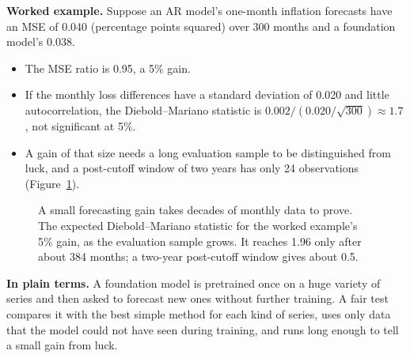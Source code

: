 \textbf{Worked example.} Suppose an AR model's one-month inflation forecasts have an MSE of 0.040 (percentage points squared) over 300 months and a foundation model's 0.038.

\begin{itemize}
  \item The MSE ratio is 0.95, a 5\% gain.
  \item If the monthly loss differences have a standard deviation of 0.020 and little autocorrelation, the Diebold--Mariano statistic is $0.002 / (0.020/\sqrt{300}) \approx 1.7$, not significant at 5\%.
  \item A gain of that size needs a long evaluation sample to be distinguished from luck, and a post-cutoff window of two years has only 24 observations (Figure~\ref{fig:21-dm}).
\end{itemize}

\begin{figure}[htbp]
\centering
{}
\caption{A small forecasting gain takes decades of monthly data to prove. The expected Diebold--Mariano statistic for the worked example's 5\% gain, as the evaluation sample grows. It reaches 1.96 only after about 384 months; a two-year post-cutoff window gives about 0.5.}
\label{fig:21-dm}
\end{figure}

\noindent\textbf{In plain terms.} A foundation model is pretrained once on a huge variety of series and then asked to forecast new ones without further training. A fair test compares it with the best simple method for each kind of series, uses only data that the model could not have seen during training, and runs long enough to tell a small gain from luck.

